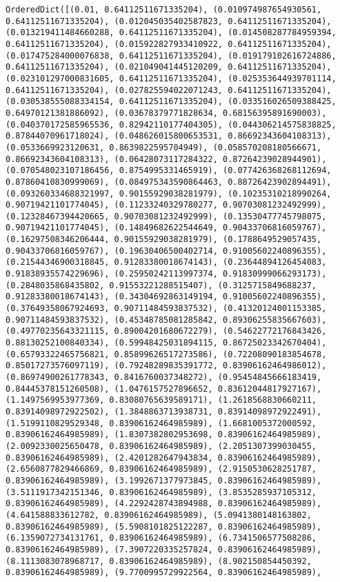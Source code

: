 \documentclass[11pt]{article}
\begin{document}
\begin{Verbatim}[commandchars=\\\{\}]
OrderedDict([(0.01, 0.64112511671335204), (0.010974987654930561, 0.64112511671335204), (0.012045035402587823, 0.64112511671335204), (0.013219411484660288, 0.64112511671335204), (0.014508287784959394, 0.64112511671335204), (0.015922827933410922, 0.64112511671335204), (0.017475284000076838, 0.64112511671335204), (0.019179102616724886, 0.64112511671335204), (0.021049041445120209, 0.64112511671335204), (0.023101297000831605, 0.64112511671335204), (0.025353644939701114, 0.64112511671335204), (0.027825594022071243, 0.64112511671335204), (0.030538555088334154, 0.64112511671335204), (0.033516026509388425, 0.64970121381886092), (0.03678379771828634, 0.68156395891690003), (0.040370172585965536, 0.82942110177404305), (0.044306214575838825, 0.87844070961718024), (0.048626015800653531, 0.86692343604108313), (0.0533669923120631, 0.8639822595704949), (0.058570208180566671, 0.86692343604108313), (0.06428073117284322, 0.87264239028944901), (0.070548023107186456, 0.8754995331465919), (0.077426368268112694, 0.87860410830999069), (0.084975343590864463, 0.88726423902894491), (0.093260334688321997, 0.90155929038281979), (0.10235310218990264, 0.90719421101774045), (0.11233240329780277, 0.90703081232492999), (0.12328467394420665, 0.90703081232492999), (0.13530477745798075, 0.90719421101774045), (0.14849682622544649, 0.90433706816059767), (0.16297508346206444, 0.90155929038281979), (0.1788649529057435, 0.90433706816059767), (0.19630406500402714, 0.91005602240896355), (0.21544346900318845, 0.91283380018674143), (0.23644894126454083, 0.91838935574229696), (0.25950242113997374, 0.91830999066293173), (0.2848035868435802, 0.91553221288515407), (0.3125715849688237, 0.91283380018674143), (0.34304692863149194, 0.91005602240896355), (0.37649358067924693, 0.90711484593837532), (0.41320124001153385, 0.90711484593837532), (0.45348785081285842, 0.89306255835667603), (0.49770235643321115, 0.89004201680672279), (0.54622772176843426, 0.88130252100840334), (0.59948425031894115, 0.86725023342670404), (0.65793322465756821, 0.85899626517273586), (0.72208090183854678, 0.85017273576097119), (0.79248289835391772, 0.83906162464986012), (0.86974900261778343, 0.8416760037348272), (0.95454845666183419, 0.84445378151260508), (1.0476157527896652, 0.83612044817927167), (1.1497569953977369, 0.83080765639589171), (1.2618568830660211, 0.83914098972922502), (1.3848863713938731, 0.83914098972922491), (1.5199110829529348, 0.83906162464985989), (1.6681005372000592, 0.83906162464985989), (1.8307382802953698, 0.83906162464985989), (2.0092330025650478, 0.83906162464985989), (2.2051307399030455, 0.83906162464985989), (2.4201282647943834, 0.83906162464985989), (2.6560877829466869, 0.83906162464985989), (2.9150530628251787, 0.83906162464985989), (3.1992671377973845, 0.83906162464985989), (3.5111917342151346, 0.83906162464985989), (3.8535285937105312, 0.83906162464985989), (4.2292428743894988, 0.83906162464985989), (4.641588833612782, 0.83906162464985989), (5.0941380148163802, 0.83906162464985989), (5.5908101825122287, 0.83906162464985989), (6.1359072734131761, 0.83906162464985989), (6.7341506577508286, 0.83906162464985989), (7.3907220335257824, 0.83906162464985989), (8.1113083078968717, 0.83906162464985989), (8.902150854450392, 0.83906162464985989), (9.7700995729922564, 0.83906162464985989), 
\end{Verbatim}
\end{document}
